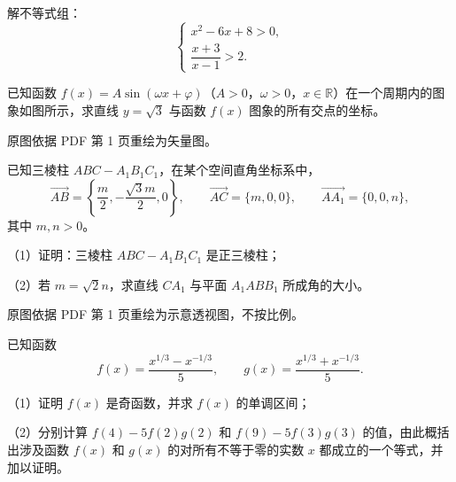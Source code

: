 \begin{question}
解不等式组：
\nopagebreak[4]
\[
\begin{cases}
x^2-6x+8>0,\\[2pt]
\dfrac{x+3}{x-1}>2.
\end{cases}
\]

\Needspace{0.4\textheight}
\end{question}
\begin{question}
已知函数 $f(x)=A\sin(\omega x+\varphi)$（$A>0$，$\omega>0$，$x\in\mathbb R$）在一个周期内的图象如图所示，求直线 $y=\sqrt3$ 与函数 $f(x)$ 图象的所有交点的坐标。

\begin{gktip}
原图依据 PDF 第 1 页重绘为矢量图。
\end{gktip}
\nopagebreak[4]
\begin{center}\end{center}
\nopagebreak[4]
\Needspace{0.4\textheight}
\end{question}
\begin{question}
已知三棱柱 $ABC-A_1B_1C_1$，在某个空间直角坐标系中，
\nopagebreak[4]
\[
\overrightarrow{AB}=\left\{\dfrac m2,-\dfrac{\sqrt3m}{2},0\right\},\qquad
\overrightarrow{AC}=\{m,0,0\},\qquad
\overrightarrow{AA_1}=\{0,0,n\},
\]
其中 $m,n>0$。

（1）证明：三棱柱 $ABC-A_1B_1C_1$ 是正三棱柱；

（2）若 $m=\sqrt2n$，求直线 $CA_1$ 与平面 $A_1ABB_1$ 所成角的大小。

\begin{gktip}
原图依据 PDF 第 1 页重绘为示意透视图，不按比例。
\end{gktip}
\nopagebreak[4]
\begin{center}\end{center}
\nopagebreak[4]
\end{question}
\begin{question}
已知函数
\nopagebreak[4]
\[
f(x)=\dfrac{x^{1/3}-x^{-1/3}}{5},\qquad
g(x)=\dfrac{x^{1/3}+x^{-1/3}}{5}.
\]

（1）证明 $f(x)$ 是奇函数，并求 $f(x)$ 的单调区间；

（2）分别计算 $f(4)-5f(2)g(2)$ 和 $f(9)-5f(3)g(3)$ 的值，由此概括出涉及函数 $f(x)$ 和 $g(x)$ 的对所有不等于零的实数 $x$ 都成立的一个等式，并加以证明。

\end{question}
